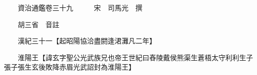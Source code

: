 










 


 
 


 

  
  
  
  
  





  
  
  
  
  
 
  

  

  
  
  



  

 
 

  
   




  

  
  


  　　資治通鑑卷三十九　　　宋　司馬光　撰

　　胡三省　音註

　　漢紀三十一【起昭陽協洽盡閼逢涒灘凡二年】

　　淮陽王【諱玄字聖公光武族兄也帝王世紀曰舂陵戴侯熊渠生蒼梧太守利利生子張子張生玄後敗降赤眉光武詔封為淮陽王】

